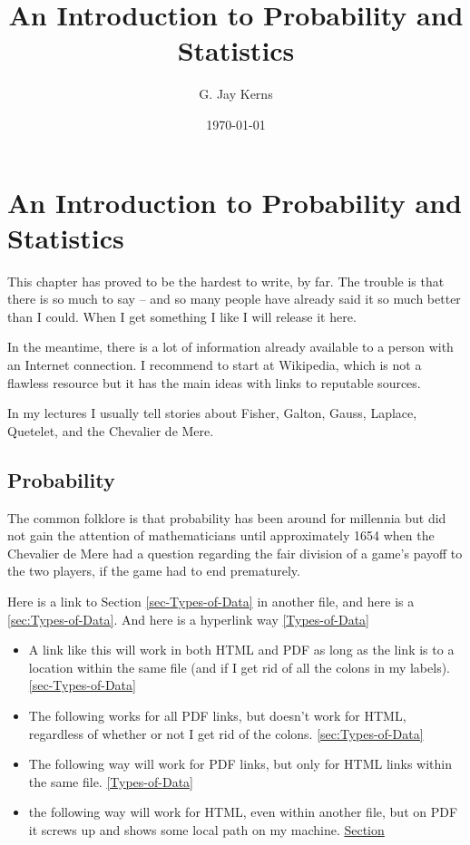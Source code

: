 \documentclass{scrbook}
\title{An Introduction to Probability and Statistics}
\author{G. Jay Kerns}
\date{\today}
\begin{document}
\maketitle




\chapter{An Introduction to Probability and Statistics}
\label{sec-1}


\noindent 
This chapter has proved to be the hardest to write, by far. The trouble is that there is so much to say -- and so many people have already said it so much better than I could. When I get something I like I will release it here.

In the meantime, there is a lot of information already available to a person with an Internet connection. I recommend to start at Wikipedia, which is not a flawless resource but it has the main ideas with links to reputable sources.

In my lectures I usually tell stories about Fisher, Galton, Gauss, Laplace, Quetelet, and the Chevalier de Mere.
\section{Probability}
\label{sec-1-1}


The common folklore is that probability has been around for millennia but did not gain the attention of mathematicians until approximately 1654 when the Chevalier de Mere had a question regarding the fair division of a game's payoff to the two players, if the game had to end prematurely.

Here is a link to Section \ref{sec-Types-of-Data} in another file, and here is a \ref{sec:Types-of-Data}.  And here is a hyperlink way \ref{Types-of-Data}

\begin{itemize}
\item A link like this will work in both HTML and PDF as long as the link is to a location within the same file (and if I get rid of all the colons in my labels).  \ref{sec-Types-of-Data}
\item The following works for all PDF links, but doesn't work for HTML, regardless of whether or not I get rid of the colons.   \ref{sec:Types-of-Data}
\item The following way will work for PDF links, but only for HTML links within the same file.   \ref{Types-of-Data}
\item the following way will work for HTML, even within another file, but on PDF it screws up and shows some local path on my machine. \href{file:///home/jay/Desktop/git/IPSUR/data-description.org}{Section}
\end{itemize}
\end{document}
